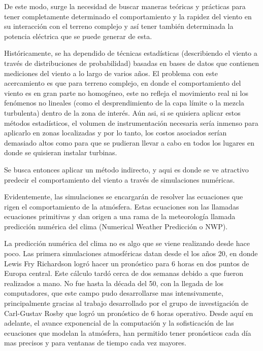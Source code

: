 De este modo, surge la necesidad de buscar maneras teóricas y prácticas para tener completamente determinado el comportamiento y la rapidez del viento en su interacción con el terreno complejo y así tener también determinada la potencia eléctrica que se puede generar de esta.

Históricamente, se ha dependido de técnicas estadísticas (describiendo el viento a través de distribuciones de probabilidad) basadas en bases de datos que contienen mediciones del viento a lo largo de varios años. El problema con este acercamiento es que para terreno complejo, en donde el comportamiento del viento es en gran parte no homogéneo, este no refleja el movimiento real ni los fenómenos no lineales (como el desprendimiento de la capa límite o la mezcla turbulenta) dentro de la zona de interés. Aún asi, si se quisiera aplicar estos métodos estadísticos, el volumen de instrumentación necesaria sería inmenso para aplicarlo en zonas localizadas y por lo tanto, los costos asociados serían demasiado altos como para que se pudieran llevar a cabo en todos los lugares en donde se quisieran instalar turbinas.

Se busca entonces aplicar un método indirecto, y aqui es donde se ve atractivo predecir el comportamiento del viento a través de simulaciones numéricas. 

Evidentemente, las simulaciones se encargarán de resolver las ecuaciones que rigen el comportamiento de la atmósfera. Estas ecuaciones son las llamadas ecuaciones primitivas y dan origen a una rama de la meteorología llamada predicción numérica del clima (Numerical Weather Predicción o NWP).

La predicción numérica del clima no es algo que se viene realizando desde hace poco. Las primera simulaciones atmosféricas datan desde el los años 20, en donde Lewis Fry Richardson logró hacer un pronóstico para 6 horas en dos puntos de Europa central. Este cálculo tardó cerca de dos semanas debido a que fueron realizados a mano. No fue hasta la década del 50, con la llegada de los computadores, que este campo pudo desarrollarse mas intensivamente, principalmente gracias al trabajo desarrollado por el grupo de investigación de Carl-Gustav Rosby que logró un pronóstico de 6 horas operativo. Desde aquí en adelante, el avance exponencial de la computación y la sofisticación de las ecuaciones que modelan la atmósfera, han permitido tener pronósticos cada día mas precisos y para ventanas de tiempo cada vez mayores. 

